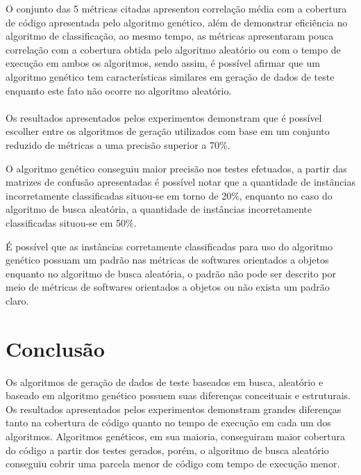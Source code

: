 \documentclass[
	12pt,				%
	oneside,			%
	a4paper,			%
	english,			%
	brazil				%
	]{abntex2ppgsi}
\begin{document}
O conjunto das 5 métricas citadas apresentou correlação média com a cobertura de código apresentada pelo algoritmo genético, além de demonstrar eficiência no algoritmo de classificação, ao mesmo tempo,  as métricas apresentaram pouca correlação com a cobertura obtida pelo algoritmo aleatório ou com o tempo de execução em ambos os algoritmos, sendo assim, é possível afirmar que um algoritmo genético tem características similares em geração de dados de teste enquanto este fato não ocorre no algoritmo aleatório. \\


\\

Os resultados apresentados pelos experimentos demonstram que é possível escolher entre os algoritmos de geração utilizados com base em um conjunto reduzido de métricas a uma precisão superior a 70\%.

O algoritmo genético conseguiu maior precisão nos testes efetuados, a partir das matrizes de confusão apresentadas é possível notar que a quantidade de instâncias incorretamente classificadas situou-se em torno de 20\%, enquanto no caso do algoritmo de busca aleatória, a quantidade de instâncias incorretamente classificadas situou-se em 50\%.

É possível que as instâncias corretamente classificadas para uso do algoritmo genético possuam um padrão nas métricas de softwares orientados a objetos enquanto no algoritmo de busca aleatória, o padrão não pode ser descrito por meio de métricas de softwares orientados a objetos ou não exista um padrão claro.


\chapter{Conclusão}
\label{chap:conclusao}

Os algoritmos de geração de dados de teste baseados em busca, aleatório e baseado em algoritmo genético possuem suas diferenças conceituais e estruturais.  Os resultados apresentados pelos experimentos demonstram grandes diferenças tanto na cobertura de código quanto no tempo de execução em cada um dos algoritmos. Algoritmos genéticos, em sua maioria, conseguiram maior cobertura do código a partir dos testes gerados, porém, o algoritmo de busca aleatório conseguiu cobrir uma parcela menor de código com tempo de execução menor.
\end{document}
